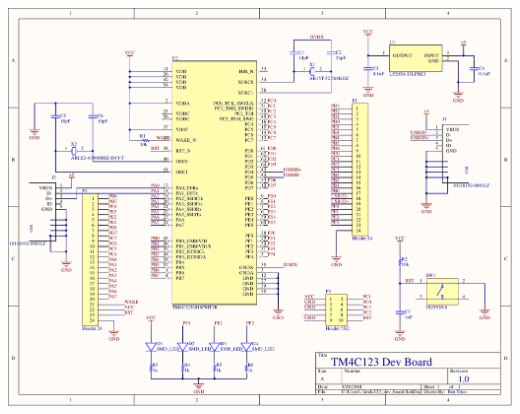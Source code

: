 \begin{center}
\includegraphics[page=3,width=\textwidth,angle=270]{PDFs/tm4c123_dev_board.PDF} \newpage
\end{center}